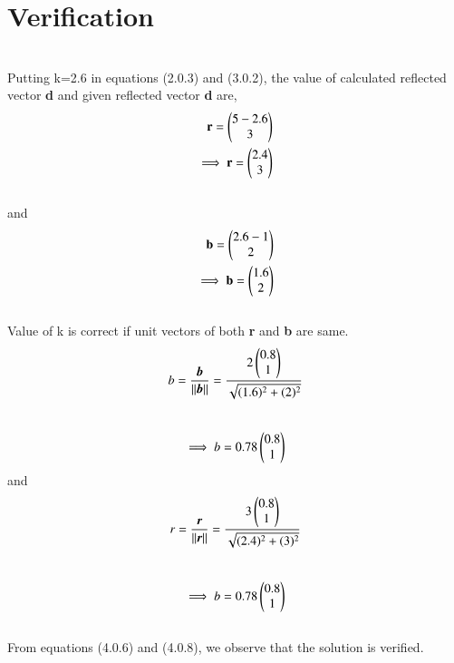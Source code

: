 \documentclass[journal,12pt,twocolumn]{IEEEtran}
\begin{document}
\section{Verification}
\\
Putting k=2.6 in equations (2.0.3) and (3.0.2), the value of calculated reflected vector \textbf{d} and given reflected vector \textbf{d} are,
\begin{align}
\textbf{r}=\begin{pmatrix}5-2.6 \\ 3\end{pmatrix}\\
\implies \textbf{r}=\begin{pmatrix}2.4\\3\end{pmatrix}
\end{align}\\
and\\
\begin{align}
\textbf{b}=\begin{pmatrix}2.6-1 \\ 2\end{pmatrix}\\
\implies \textbf{b}=\begin{pmatrix}1.6\\2\end{pmatrix}
\end{align}\\
Value of k is correct if unit vectors of both \textbf{r} and \textbf{b} are same.
\\
\begin{align}
    b=\frac{\bm b}{\left\lVert\bm b\right\rVert}= \frac{2 \begin{pmatrix}0.8\\1\end{pmatrix}}{\sqrt{(1.6)^2+(2)^2}}
    \end{align}\\
    \begin{align}
    \implies b=0.78 \begin{pmatrix}0.8\\1\end{pmatrix}
    \end{align}
and \\
\begin{align}
    r=\frac{\bm r}{\left\lVert\bm r\right\rVert}= \frac{3 \begin{pmatrix}0.8\\1\end{pmatrix}}{\sqrt{(2.4)^2+(3)^2}}
    \end{align}\\
    \begin{align}
    \implies b=0.78 \begin{pmatrix}0.8\\1\end{pmatrix}
    \end{align}
    \\
    From equations (4.0.6) and (4.0.8), we observe that the solution is verified.\\
\\
\end{document}
